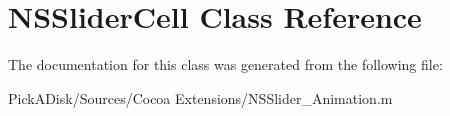 \hypertarget{class_n_s_slider_cell}{
\section{NSSliderCell Class Reference}
\label{class_n_s_slider_cell}
}


The documentation for this class was generated from the following file:\begin{DoxyCompactItemize}
\item 
PickADisk/Sources/Cocoa Extensions/NSSlider\_\-Animation.m\end{DoxyCompactItemize}
